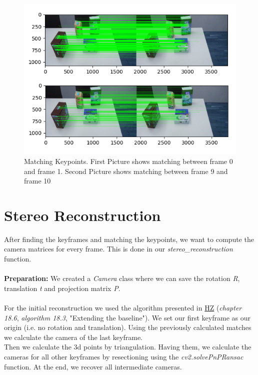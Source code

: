 \documentclass[paper=a4, fontsize=11pt]{scrartcl}
\numberwithin{equation}{section}		%
\numberwithin{figure}{section}			%
\numberwithin{table}{section}				%
\begin{document}
\begin{figure}[h!]
\centering
\includegraphics[width=1\textwidth]{img/matching}
\caption{Matching Keypoints. First Picture shows matching between frame 0 and frame 1. Second Picture shows matching between frame 9 and frame 10}
\end{figure}

\section*{Stereo Reconstruction}
After finding the keyframes and matching the keypoints, we want to compute the camera matrices for every frame. This is done in our \emph{stereo\_reconstruction} function.\\\\\textbf{Preparation:} We created a \emph{Camera} class where we can save the rotation \emph{R}, translation \emph{t} and projection matrix \emph{P}.\\\\For the initial reconstruction we used the algorithm presented in \href{http://www.robots.ox.ac.uk/~vgg/hzbook/}{HZ} (\emph{chapter 18.6}, \emph{algorithm 18.3}, "Extending the baseline"). We set our first keyframe as our origin (i.e. no rotation and translation). Using the previously calculated matches we calculate the camera of the last keyframe.\\Then we calculate the 3d points by triangulation. Having them, we calculate the cameras for all other keyframes by resectioning using the \emph{cv2.solvePnPRansac} function. At the end, we recover all intermediate cameras.
\end{document}
